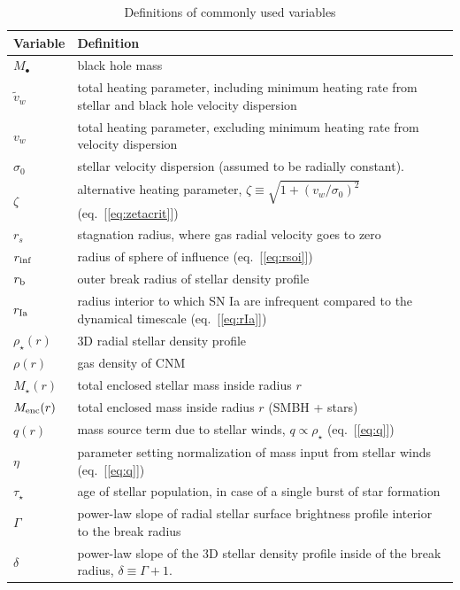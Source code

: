 \documentclass[usenatbib,fleqn]{mn2e}
\begin{document}
\begin{table}
\begin{threeparttable}
\begin{minipage}{18cm}
\caption{Definitions of commonly used variables}
\begin{tabular}{ll}
  \hline
  {Variable} & {Definition} \\
  \hline
  $M_{\bullet}$ & black hole mass \\
  $\tilde{v}_{w}$ & total heating parameter, including minimum heating
  rate from stellar and black hole velocity dispersion \\
  $v_{w}$ & total heating parameter, excluding minimum heating rate from
  velocity dispersion \\
   $\sigma_0$ & stellar velocity dispersion (assumed to be radially
   constant).\\
  $\zeta$ & alternative heating parameter, $\zeta \equiv \sqrt{1 + (v_w/\sigma_0)^2}$ (eq.~[\ref{eq:zetacrit}])\\
  $r_{s}$ & stagnation radius, where gas radial velocity goes to zero \\
  $r_{\rm inf}$ & radius of sphere of influence (eq.~[\ref{eq:rsoi}]) \\
  $r_{\rm b}$ & outer break radius of stellar density profile \\ 
  $r_{\rm Ia}$ & radius interior to which SN Ia are infrequent compared to the dynamical timescale (eq.~[\ref{eq:rIa}]) \\ 
  $\rho_{\star}(r)$ & 3D radial stellar density profile \\
  $\rho(r)$ & gas density of CNM \\
  $M_{\star}(r)$ & total enclosed stellar mass inside radius $r$ \\
  $M_{\rm enc}(r)$ & total enclosed mass inside radius $r$ (SMBH + stars) \\
  $q(r)$ & mass source term due to stellar winds, $q \propto \rho_{\star}$ (eq.~[\ref{eq:q}]) \\
  $\eta$ & parameter setting normalization of mass input from stellar winds (eq.~[\ref{eq:q}]) \\
  $\tau_{\star}$ & age of stellar population, in case of a single burst of star formation \\
  $\Gamma$ & power-law slope of radial stellar surface brightness
  profile interior to the break radius \\
  $\delta$ & power-law slope of the 3D stellar density profile inside of
  the break radius, $\delta \equiv \Gamma+1$.\\

\end{tabular}
\end{minipage}
\end{threeparttable}
\end{table}
\end{document}

